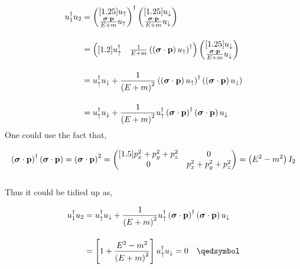 \begin{solution}
\begin{align*}
    u_1^\dagger u_2 &=  \begin{pmatrix}[1.25]
        u_\uparrow \\
        \frac{\boldsymbol{\sigma}\cdot\mathbf{p}}{E+m} u_\uparrow
    \end{pmatrix}^\dagger
    \begin{pmatrix}[1.25]
        u_\downarrow \\
        \frac{\boldsymbol{\sigma}\cdot\mathbf{p}}{E+m} u_\downarrow
    \end{pmatrix} \\[0.15in]
    &=  \begin{pmatrix}[1.2]
        u_\uparrow^\dagger & \frac{1}{E+m} \left(\left(\boldsymbol{\sigma}\cdot\mathbf{p}\right) u_\uparrow\right)^\dagger
    \end{pmatrix}
    \begin{pmatrix}[1.25]
        u_\downarrow \\
        \frac{\boldsymbol{\sigma}\cdot\mathbf{p}}{E+m} u_\downarrow \\
    \end{pmatrix} \\[0.15in]
    &=  u_\uparrow^\dagger u_\downarrow + \frac{1}{\left(E+m\right)^2} \left(\left(\boldsymbol{\sigma}\cdot\mathbf{p}\right) u_\uparrow\right)^\dagger \left(\left(\boldsymbol{\sigma}\cdot\mathbf{p}\right) u_\downarrow\right) \\[0.15in]
    &=  u_\uparrow^\dagger u_\downarrow + \frac{1}{\left(E+m\right)^2}  u_\uparrow^\dagger \left(\boldsymbol{\sigma}\cdot\mathbf{p}\right)^\dagger \left(\boldsymbol{\sigma}\cdot\mathbf{p}\right) u_\downarrow  
\end{align*}
One could use the fact that,

\begin{align*}
    \left(\boldsymbol{\sigma}\cdot\mathbf{p}\right)^\dagger \left(\boldsymbol{\sigma}\cdot\mathbf{p}\right) =  \left(\boldsymbol{\sigma}\cdot\mathbf{p}\right)^2 = \begin{pmatrix}[1.5]
        p_x^2 + p_y^2 + p_z^2 & 0 \\
        0 & p_x^2 + p_y^2 + p_z^2 \\
    \end{pmatrix} = \left(E^2-m^2\right)I_2
\end{align*}\\
Thus it could be tidied up as, 

\begin{align*}
    u_1^\dagger u_2 &=  u_\uparrow^\dagger u_\downarrow + \frac{1}{\left(E+m\right)^2}  u_\uparrow^\dagger \left(\boldsymbol{\sigma}\cdot\boldp\right)^\dagger \left(\boldsymbol{\sigma}\cdot\boldp\right) u_\downarrow  \\[0.15in]
                    &= \left[ 1 + \frac{E^2-m^2}{\left(E+m\right)^2}  \right]  u_\uparrow^\dagger u_\downarrow = 0 \qed
\end{align*}
\end{solution}

